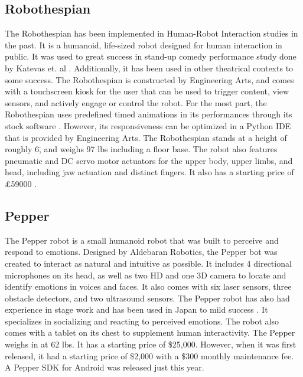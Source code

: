 \documentclass[onecolumn, draftclsnofoot,10pt, compsoc]{IEEEtran}
\begin{document}
\subsection{Robothespian}
The Robothespian has been implemented in Human-Robot Interaction studies in the past.
It is a humanoid, life-sized robot designed for human interaction in public.
It was used to great success in stand-up comedy performance study done by Katevas et. al \cite{KatevasRobot:2014}.
Additionally, it has been used in other theatrical contexts \cite{Spillikin} to some success.
The Robothespian is constructed by Engineering Arts, and comes with a touchscreen kiosk for the user that can be used to trigger content, view sensors, and actively engage or control the robot.
For the most part, the Robothespian uses predefined timed animations in its performances through its stock software \cite{KatevasRobot:2014}.
However, its responsiveness can be optimized in a Python IDE that is provided by Engineering Arts.
The Robothespian stands at a height of roughly 6\", and weighs 97 lbs including a floor base.
The robot also features pneumatic and DC servo motor actuators for the upper body, upper limbs, and head, including jaw actuation and distinct fingers.
It also has a starting price of \pounds59000 \cite{EngineeredArts}.


\subsection{Pepper}
The Pepper robot is a small humanoid robot that was built to perceive and respond to emotions.
Designed by Aldebaran Robotics, the Pepper bot was created to interact as natural and intuitive as possible.
It includes 4 directional microphones on its head, as well as two HD and one 3D camera to locate and identify emotions in voices and faces.
It also comes with six laser sensors, three obstacle detectors, and two ultrasound sensors.
The Pepper robot has also had experience in stage work and has been used in Japan to mild success \cite{PepperVid}.
It specializes in socializing and reacting to perceived emotions.
The robot also comes with a tablet on its chest to supplement human interactivity.
The Pepper weighs in at 62 lbs.
It has a starting price of \$25,000. However, when it was first released, it had a starting price of \$2,000 with a \$300 monthly maintenance fee.
A Pepper SDK for Android was released just this year. \cite{PepperBot}
\end{document}
